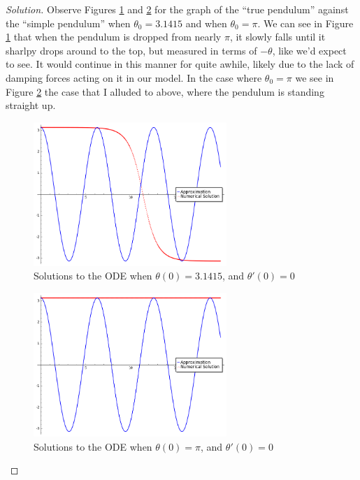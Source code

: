 \documentclass[letterpaper, 12pt]{amsart}
\theoremstyle{definition}  							%
\begin{document}
		\begin{proof}[Solution]
		Observe Figures \ref{theta314} and \ref{thetapi} for the graph of the ``true pendulum'' against the ``simple pendulum'' when $\theta_{0} = 3.1415$ and when $\theta_{0} = \pi$.
		We can see in Figure \ref{theta314} that when the pendulum is dropped from nearly $\pi$, it slowly falls until it sharlpy drops around to the top, but measured in terms of $-\theta$, like we'd expect to see.
		It would continue in this manner for quite awhile, likely due to the lack of damping forces acting on it in our model.
		In the case where $\theta_{0} = \pi$ we see in Figure \ref{thetapi} the case that I alluded to above, where the pendulum is standing straight up.
		\begin{figure}[b]
			\includegraphics[width=0.65\textwidth]{images/theta314.png}
			\caption{Solutions to the ODE when $\theta(0)=3.1415$, and $\theta'(0)=0$}
			\label{theta314}
		\end{figure}
		\begin{figure}[b]
			\includegraphics[width=0.65\textwidth]{images/thetapi.png}
			\caption{Solutions to the ODE when $\theta(0)=\pi$, and $\theta'(0)=0$}
			\label{thetapi}
		\end{figure}
		\end{proof}
\end{document}
